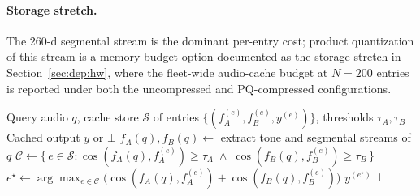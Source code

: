 \documentclass[a4paper,fleqn]{cas-dc}
\begin{document}
\paragraph{Storage stretch.} The 260-d segmental stream is the dominant per-entry cost; product quantization of this stream is a memory-budget option documented as the storage stretch in Section~\ref{sec:dep:hw}, where the fleet-wide audio-cache budget at $N = 200$ entries is reported under both the uncompressed and PQ-compressed configurations.

\begin{algorithm}
\caption{Two-stream voting cache lookup (existence rule)}\label{alg:voting}
\begin{algorithmic}[1]
\Require Query audio $q$, cache store $\mathcal{S}$ of entries $\{(f_A^{(e)}, f_B^{(e)}, y^{(e)})\}$, thresholds $\tau_A, \tau_B$
\Ensure Cached output $y$ or $\bot$
\State $f_A(q), f_B(q) \gets$ extract tone and segmental streams of $q$
\State $\mathcal{C} \gets \{\, e \in \mathcal{S} : \cos(f_A(q), f_A^{(e)}) \geq \tau_A \;\wedge\; \cos(f_B(q), f_B^{(e)}) \geq \tau_B \,\}$
    \State $e^\star \gets \arg\max_{e \in \mathcal{C}} \big(\cos(f_A(q), f_A^{(e)}) + \cos(f_B(q), f_B^{(e)})\big)$
    \State \Return $y^{(e^\star)}$ 
\Else
    \State \Return $\bot$ 
\EndIf
\end{algorithmic}
\end{algorithm}
\end{document}
